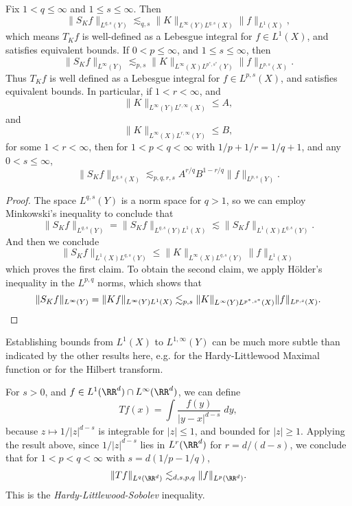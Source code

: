 \begin{theorem}
    Fix $1 < q \leq \infty$ and $1 \leq s \leq \infty$. Then
    \[ \| S_K f \|_{L^{q,s}(Y)} \lesssim_{q,s} \| K \|_{L^\infty(Y) L^{q,s}(X)} \| f \|_{L^1(X)}, \]
    which means $T_K f$ is well-defined as a Lebesgue integral for $f \in L^1(X)$, and satisfies equivalent bounds. If $0 < p \leq \infty$, and $1 \leq s \leq \infty$, then
    \[ \| S_K f \|_{L^\infty(Y)} \lesssim_{p,s} \| K \|_{L^\infty(X) L^{p^*,s^*}(Y)} \| f \|_{L^{p,s}(X)}. \]
    Thus $T_K f$ is well defined as a Lebesgue integral for $f \in L^{p,s}(X)$, and satisfies equivalent bounds. In particular, if $1 < r < \infty$, and
    \[ \| K \|_{L^\infty(Y) L^{r,\infty}(X)} \leq A, \]
    and
    \[ \| K \|_{L^\infty(X) L^{r,\infty}(Y)} \leq B, \]
    for some $1 < r < \infty$, then for $1 < p < q < \infty$ with $1/p + 1/r = 1/q + 1$, and any $0 < s \leq \infty$,
    \[ \| S_K f \|_{L^{q,s}(X)} \lesssim_{p,q,r,s} A^{r/q} B^{1 - r/q} \| f \|_{L^{p,s}(Y)}. \]
\end{theorem}
\begin{proof}
    The space $L^{q,s}(Y)$ is a norm space for $q > 1$, so we can employ Minkowski's inequality to conclude that
    \[ \| S_K f \|_{L^{q,s}(Y)} = \| S_K f \|_{L^{q,s}(Y) L^1(X)} \lesssim \| S_K f \|_{L^1(X) L^{q,s}(Y)}. \]
    And then we conclude
    \[ \| S_K f \|_{L^1(X) L^{q,s}(Y)} \leq \| K \|_{L^\infty(X) L^{q,s}(Y)} \| f \|_{L^1(X)} \]
    which proves the first claim. To obtain the second claim, we apply H\"{o}lder's inequality in the $L^{p,q}$ norms, which shows that
    \[ \| S_K f \|_{L^\infty(Y)} = \| K f \|_{L^\infty(Y) L^1(X)} \lesssim_{p,s} \| K \|_{L^\infty(Y) L^{p^*,s^*}(X)} \| f \|_{L^{p,s}(X)}. \qedhere \]
\end{proof}

\begin{remark}
    Establishing bounds from $L^1(X)$ to $L^{1,\infty}(Y)$ can be much more subtle than indicated by the other results here, e.g. for the Hardy-Littlewood Maximal function or for the Hilbert transform.
\end{remark}

\begin{example}
    For $s > 0$, and $f \in L^1(\RR^d) \cap L^\infty(\RR^d)$, we can define
    \[ Tf(x) = \int \frac{f(y)}{|y-x|^{d-s}}\; dy, \]
    because $z \mapsto 1/|z|^{d-s}$ is integrable for $|z| \leq 1$, and bounded for $|z| \geq 1$. Applying the result above, since $1/|z|^{d-s}$ lies in $L^r(\RR^d)$ for $r = d/(d-s)$, we conclude that for $1 < p < q < \infty$ with $s = d(1/p - 1/q)$,
    \[ \| Tf \|_{L^q(\RR^d)} \lesssim_{d,s,p,q} \| f \|_{L^p(\RR^d)}. \]
    This is the \emph{Hardy-Littlewood-Sobolev} inequality.
\end{example}

